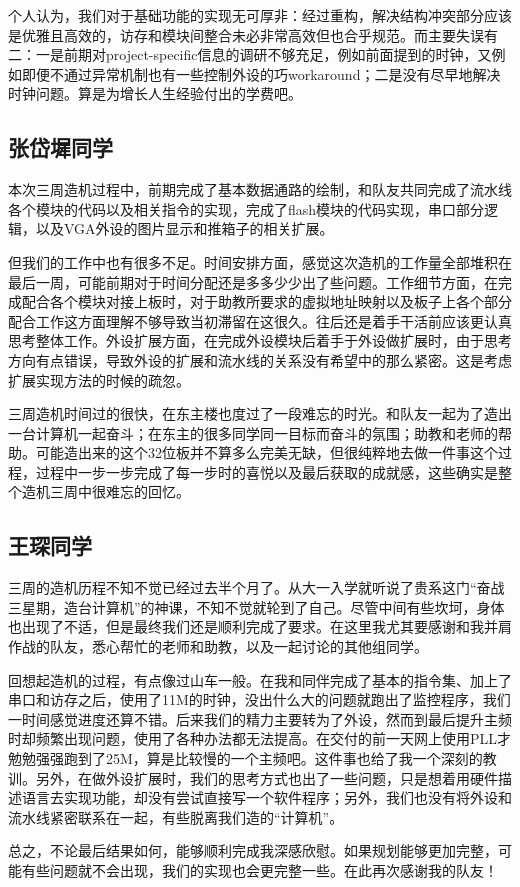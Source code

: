 \documentclass[12pt, utf8, hyperref]{ctexart}
\begin{document}
个人认为，我们对于基础功能的实现无可厚非：经过重构，解决结构冲突部分应该是优雅且高效的，访存和模块间整合未必非常高效但也合乎规范。而主要失误有二：一是前期对project-specific信息的调研不够充足，例如前面提到的时钟，又例如即便不通过异常机制也有一些控制外设的巧workaround；二是没有尽早地解决时钟问题。算是为增长人生经验付出的学费吧。

\subsection*{张岱墀同学}
本次三周造机过程中，前期完成了基本数据通路的绘制，和队友共同完成了流水线各个模块的代码以及相关指令的实现，完成了flash模块的代码实现，串口部分逻辑，以及VGA外设的图片显示和推箱子的相关扩展。

但我们的工作中也有很多不足。时间安排方面，感觉这次造机的工作量全部堆积在最后一周，可能前期对于时间分配还是多多少少出了些问题。工作细节方面，在完成配合各个模块对接上板时，对于助教所要求的虚拟地址映射以及板子上各个部分配合工作这方面理解不够导致当初滞留在这很久。往后还是着手干活前应该更认真思考整体工作。外设扩展方面，在完成外设模块后着手于外设做扩展时，由于思考方向有点错误，导致外设的扩展和流水线的关系没有希望中的那么紧密。这是考虑扩展实现方法的时候的疏忽。

三周造机时间过的很快，在东主楼也度过了一段难忘的时光。和队友一起为了造出一台计算机一起奋斗；在东主的很多同学同一目标而奋斗的氛围；助教和老师的帮助。可能造出来的这个32位板并不算多么完美无缺，但很纯粹地去做一件事这个过程，过程中一步一步完成了每一步时的喜悦以及最后获取的成就感，这些确实是整个造机三周中很难忘的回忆。

\subsection*{王琛同学}
三周的造机历程不知不觉已经过去半个月了。从大一入学就听说了贵系这门“奋战三星期，造台计算机”的神课，不知不觉就轮到了自己。尽管中间有些坎坷，身体也出现了不适，但是最终我们还是顺利完成了要求。在这里我尤其要感谢和我并肩作战的队友，悉心帮忙的老师和助教，以及一起讨论的其他组同学。

回想起造机的过程，有点像过山车一般。在我和同伴完成了基本的指令集、加上了串口和访存之后，使用了11M的时钟，没出什么大的问题就跑出了监控程序，我们一时间感觉进度还算不错。后来我们的精力主要转为了外设，然而到最后提升主频时却频繁出现问题，使用了各种办法都无法提高。在交付的前一天网上使用PLL才勉勉强强跑到了25M，算是比较慢的一个主频吧。这件事也给了我一个深刻的教训。另外，在做外设扩展时，我们的思考方式也出了一些问题，只是想着用硬件描述语言去实现功能，却没有尝试直接写一个软件程序；另外，我们也没有将外设和流水线紧密联系在一起，有些脱离我们造的“计算机”。

总之，不论最后结果如何，能够顺利完成我深感欣慰。如果规划能够更加完整，可能有些问题就不会出现，我们的实现也会更完整一些。在此再次感谢我的队友！
\end{document}
